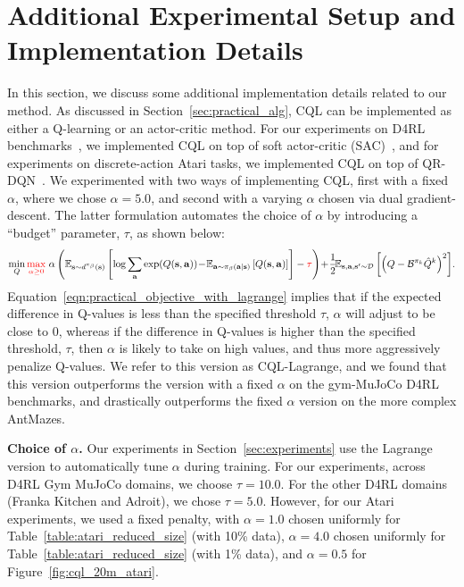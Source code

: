 \section{Additional Experimental Setup and Implementation Details}
\label{sec:experimental_details}
In this section, we discuss some additional implementation details related to our method. As discussed in Section~\ref{sec:practical_alg}, CQL can be implemented as either a Q-learning or an actor-critic method. For our experiments on D4RL benchmarks~\citep{d4rl}, we implemented CQL on top of soft actor-critic (SAC)~\citep{haarnoja}, and for experiments on discrete-action Atari tasks, we implemented CQL on top of QR-DQN~\citep{dabney2018distributional}.
We experimented with two ways of implementing CQL, first with a fixed $\alpha$, where we chose $\alpha=5.0$, and second with a varying $\alpha$ chosen via dual gradient-descent. The latter formulation automates the choice of $\alpha$ by introducing a ``budget'' parameter, $\tau$, as shown below:
\begin{equation}
    \small{\min_{Q} \textcolor{red}{\max_{\alpha \geq 0}}~ \alpha \left( \mathbb{E}_{\mathbf{s}\sim d^{\pi_\beta}(\mathbf{s})}\left[\log \sum_{\mathbf{a}} \exp(Q(\mathbf{s}, \mathbf{a}))\!-\!\mathbb{E}_{\mathbf{a}\sim {\pi_\beta}(\mathbf{a}|\mathbf{s})}\left[Q(\mathbf{s}, \mathbf{a})\right]\right] - \textcolor{red}{\tau}\right) \!+\!\frac{1}{2}\!\mathbb{E}_{\mathbf{s}, \mathbf{a}, \mathbf{s}' \sim \mathcal{D}}\left[\left(Q - \mathcal{B}^{\pi_k} \hat{Q}^{k} \right)^2 \right]\!.}
    \label{eqn:practical_objective_with_lagrange}
\end{equation}
Equation~\ref{eqn:practical_objective_with_lagrange} implies that if the expected difference in Q-values is less than the specified threshold $\tau$, $\alpha$ will adjust to be close to $0$, whereas if the difference in Q-values is higher than the specified threshold, $\tau$, then $\alpha$ is likely to take on high values, and thus more aggressively penalize Q-values. We refer to this version as CQL-Lagrange, and we found that this version outperforms the version with a fixed $\alpha$ on the gym-MuJoCo D4RL benchmarks, and drastically outperforms the fixed $\alpha$ version on the more complex AntMazes. 

\textbf{Choice of $\alpha$.} Our experiments in Section~\ref{sec:experiments} use the Lagrange version to automatically tune $\alpha$ during training. 
For our experiments, across D4RL Gym MuJoCo domains, we choose $\tau = 10.0$. For the other D4RL domains (Franka Kitchen and Adroit), we chose $\tau = 5.0$. However, for our Atari experiments, we used a fixed penalty, with $\alpha=1.0$ chosen uniformly for Table~\ref{table:atari_reduced_size} (with 10\% data), $\alpha=4.0$ chosen uniformly for Table~\ref{table:atari_reduced_size} (with 1\% data), and $\alpha=0.5$ for Figure~\ref{fig:cql_20m_atari}.

